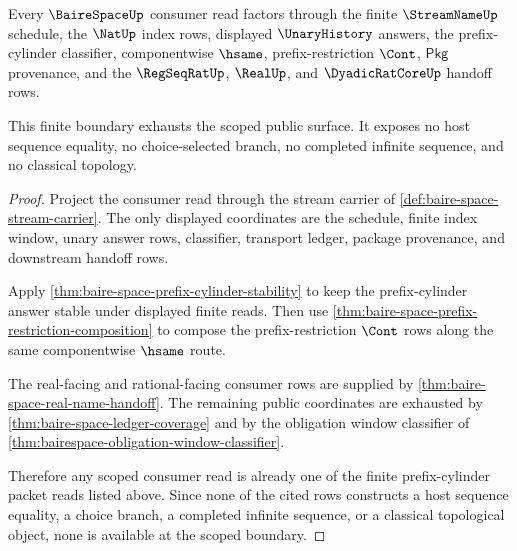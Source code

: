 \begin{theorem}
\label{thm:bairespace-scoped-finite-consumer-boundary}
Every $\BaireSpaceUp$ consumer read factors through the finite $\StreamNameUp$
schedule, the $\NatUp$ index rows, displayed $\UnaryHistory$ answers, the
prefix-cylinder classifier, componentwise $\hsame$, prefix-restriction $\Cont$,
$\mathsf{Pkg}$ provenance, and the $\RegSeqRatUp$, $\RealUp$, and
$\DyadicRatCoreUp$ handoff rows.

This finite boundary exhausts the scoped public surface. It exposes no host
sequence equality, no choice-selected branch, no completed infinite sequence,
and no classical topology.
\end{theorem}
\begin{proof}
Project the consumer read through the stream carrier of
\autoref{def:baire-space-stream-carrier}. The only displayed coordinates are
the schedule, finite index window, unary answer rows, classifier, transport
ledger, package provenance, and downstream handoff rows.

Apply \autoref{thm:baire-space-prefix-cylinder-stability} to keep the
prefix-cylinder answer stable under displayed finite reads. Then use
\autoref{thm:baire-space-prefix-restriction-composition} to compose the
prefix-restriction $\Cont$ rows along the same componentwise $\hsame$ route.

The real-facing and rational-facing consumer rows are supplied by
\autoref{thm:baire-space-real-name-handoff}. The remaining public coordinates
are exhausted by \autoref{thm:baire-space-ledger-coverage} and by the obligation
window classifier of \autoref{thm:bairespace-obligation-window-classifier}.

Therefore any scoped consumer read is already one of the finite prefix-cylinder
packet reads listed above. Since none of the cited rows constructs a host
sequence equality, a choice branch, a completed infinite sequence, or a
classical topological object, none is available at the scoped boundary.
\end{proof}

